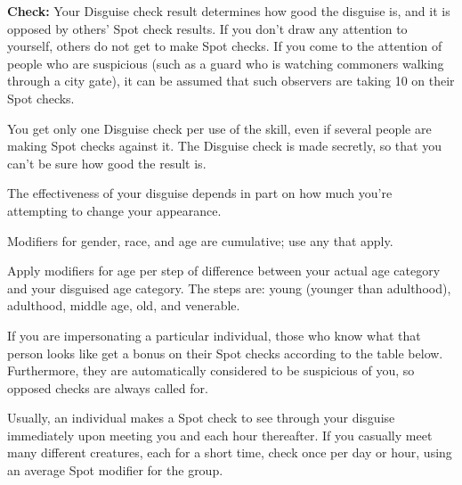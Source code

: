 \textbf{Check:} Your Disguise check result determines how good the disguise is, and it is opposed by others’ Spot check results. If you don’t draw any attention to yourself, others do not get to make Spot checks. If you come to the attention of people who are suspicious (such as a guard who is watching commoners walking through a city gate), it can be assumed that such observers are taking 10 on their Spot checks.

You get only one Disguise check per use of the skill, even if several people are making Spot checks against it. The Disguise check is made secretly, so that you can’t be sure how good the result is.

The effectiveness of your disguise depends in part on how much you’re attempting to change your appearance.


Modifiers for gender, race, and age are cumulative; use any that apply.

Apply modifiers for age per step of difference between your actual age category and your disguised age category. The steps are: young (younger than adulthood), adulthood, middle age, old, and venerable.


If you are impersonating a particular individual, those who know what that person looks like get a bonus on their Spot checks according to the table below. Furthermore, they are automatically considered to be suspicious of you, so opposed checks are always called for.


Usually, an individual makes a Spot check to see through your disguise immediately upon meeting you and each hour thereafter. If you casually meet many different creatures, each for a short time, check once per day or hour, using an average Spot modifier for the group.

